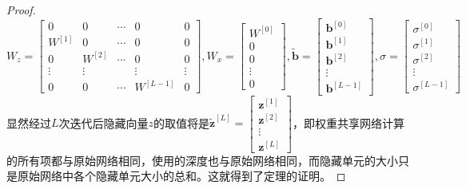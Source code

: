 \documentclass[cn,hazy,cyan,11pt,normal]{elegantnote}
\begin{document}
    \begin{proof}
        \[W_z=\begin{bmatrix}0&0&\cdots&0&0\\W^{[1]}&0&\cdots&0&0\\0&W^{[2]}&\cdots&0&0\\\vdots&\vdots&&\vdots&\vdots\\0&0&\cdots&W^{[L-1]}&0\end{bmatrix},W_x=\begin{bmatrix}W^{[0]}\\0\\0\\\vdots\\0\end{bmatrix},\tilde{\mathbf{b}}=\begin{bmatrix}\mathbf{b}^{[0]}\\\mathbf{b}^{[1]}\\\mathbf{b}^{[2]}\\\vdots\\\mathbf{b}^{[L-1]}\end{bmatrix},\sigma=\begin{bmatrix}\sigma^{[0]}\\\sigma^{[1]}\\\sigma^{[2]}\\\vdots\\\sigma^{[L-1]}\end{bmatrix}\]显然经过$L$次迭代后隐藏向量$z$的取值将是$\tilde{\mathbf{z}}^{[L]}=\begin{bmatrix}\mathbf{z}^{[1]}\\\mathbf{z}^{[2]}\\\vdots\\\mathbf{z}^{[L]}\end{bmatrix}$，即权重共享网络计算的所有项都与原始网络相同，使用的深度也与原始网络相同，而隐藏单元的大小只是原始网络中各个隐藏单元大小的总和。这就得到了定理的证明。
    \end{proof}
\end{document}
